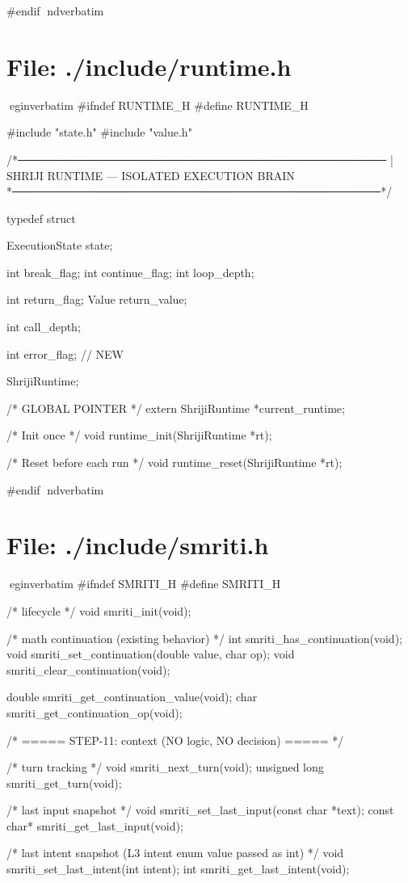 \documentclass{article}
\begin{document}
#endif
nd{verbatim}
\section*{File: ./include/runtime.h}
egin{verbatim}
#ifndef RUNTIME_H
#define RUNTIME_H

#include "state.h"
#include "value.h"

/*──────────────────────────────────────────────
 | SHRIJI RUNTIME — ISOLATED EXECUTION BRAIN
 *──────────────────────────────────────────────*/

typedef struct {

    ExecutionState state;

    int break_flag;
    int continue_flag;
    int loop_depth;

    int return_flag;
    Value return_value;

    int call_depth;

    int error_flag;   // NEW

} ShrijiRuntime;

/* GLOBAL POINTER */
extern ShrijiRuntime *current_runtime;

/* Init once */
void runtime_init(ShrijiRuntime *rt);

/* Reset before each run */
void runtime_reset(ShrijiRuntime *rt);

#endif
nd{verbatim}
\section*{File: ./include/smriti.h}
egin{verbatim}
#ifndef SMRITI_H
#define SMRITI_H

/* lifecycle */
void smriti_init(void);

/* math continuation (existing behavior) */
int  smriti_has_continuation(void);
void smriti_set_continuation(double value, char op);
void smriti_clear_continuation(void);

double smriti_get_continuation_value(void);
char   smriti_get_continuation_op(void);

/* ===== STEP-11: context (NO logic, NO decision) ===== */

/* turn tracking */
void smriti_next_turn(void);
unsigned long smriti_get_turn(void);

/* last input snapshot */
void smriti_set_last_input(const char *text);
const char* smriti_get_last_input(void);

/* last intent snapshot (L3 intent enum value passed as int) */
void smriti_set_last_intent(int intent);
int  smriti_get_last_intent(void);
\end{document}
